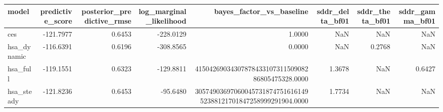 \begin{tabular}{lrrrrrrr}
\toprule
model & predictive\_score & posterior\_predictive\_rmse & log\_marginal\_likelihood & bayes\_factor\_vs\_baseline & sddr\_delta\_bf01 & sddr\_theta\_bf01 & sddr\_gamma\_bf01 \\
\midrule
ces & -121.7977 & 0.6453 & -228.0129 & 1.0000 & NaN & NaN & NaN \\
hsa\_dynamic & -116.6391 & 0.6196 & -308.8565 & 0.0000 & NaN & 0.2768 & NaN \\
hsa\_full & -119.1551 & 0.6323 & -129.8811 & 4150426903430787843310731150908286805475328.0000 & 1.3678 & NaN & 0.6427 \\
hsa\_steady & -121.8236 & 0.6453 & -95.6480 & 3057490369706004573187475161614952388121701847258999291904.0000 & 1.7734 & NaN & NaN \\
\bottomrule
\end{tabular}
